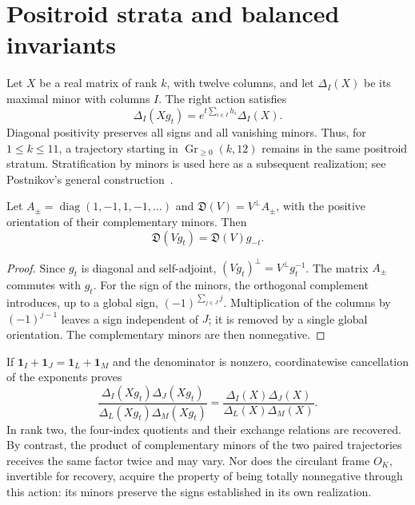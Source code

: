 \section{Positroid strata and balanced invariants}

Let \(X\) be a real matrix of rank \(k\), with twelve columns, and let \(\Delta_I(X)\) be its maximal minor with columns \(I\). The right action satisfies
\begin{equation}
 \Delta_I(Xg_t)=e^{t\sum_{i\in I}h_i}\Delta_I(X).
 \label{x_reciprocidad:rec:eq:plucker}
\end{equation}
Diagonal positivity preserves all signs and all vanishing minors. Thus, for \(1\le k\le11\), a trajectory starting in \(\operatorname{Gr}_{\ge0}(k,12)\) remains in the same positroid stratum. Stratification by minors is used here as a subsequent realization; see Postnikov's general construction~\cite{x_reciprocidad:rec:postnikov}.

\begin{proposition}
Let \(A_{\pm}=\operatorname{diag}(1,-1,1,-1,\ldots)\) and
\(\mathfrak D(V)=V^\perp A_{\pm}\), with the positive orientation of their complementary minors. Then
\[
 \mathfrak D(Vg_t)=\mathfrak D(V)g_{-t}.
\]
\end{proposition}
\begin{proof}
Since \(g_t\) is diagonal and self-adjoint,
\((Vg_t)^\perp=V^\perp g_t^{-1}\). The matrix \(A_{\pm}\) commutes with \(g_t\). For the sign of the minors, the orthogonal complement introduces, up to a global sign, \((-1)^{\sum_{j\in J}j}\). Multiplication of the columns by \((-1)^{j-1}\) leaves a sign independent of \(J\); it is removed by a single global orientation. The complementary minors are then nonnegative.
\end{proof}

If \(\mathbf1_I+\mathbf1_J=\mathbf1_L+\mathbf1_M\) and the denominator is nonzero, coordinatewise cancellation of the exponents proves
\begin{equation}
 \frac{\Delta_I(Xg_t)\Delta_J(Xg_t)}{\Delta_L(Xg_t)\Delta_M(Xg_t)}
 =\frac{\Delta_I(X)\Delta_J(X)}{\Delta_L(X)\Delta_M(X)}.
 \label{x_reciprocidad:rec:eq:cocientes}
\end{equation}
In rank two, the four-index quotients and their exchange relations are recovered. By contrast, the product of complementary minors of the two paired trajectories receives the same factor twice and may vary. Nor does the circulant frame \(O_K\), invertible for recovery, acquire the property of being totally nonnegative through this action: its minors preserve the signs established in its own realization.

